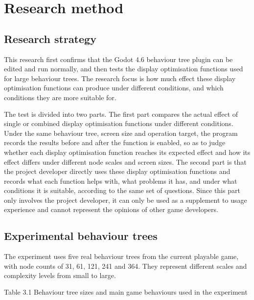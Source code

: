 \documentclass[11pt,a4paper,oneside,extrafontsizes]{memoir}
\begin{document}
\chapter{Research method}

\section{Research strategy}

This research first confirms that the Godot 4.6 behaviour tree plugin can be edited and run normally, and then tests the display optimisation functions used for large behaviour trees. The research focus is how much effect these display optimisation functions can produce under different conditions, and which conditions they are more suitable for.

The test is divided into two parts. The first part compares the actual effect of single or combined display optimisation functions under different conditions. Under the same behaviour tree, screen size and operation target, the program records the results before and after the function is enabled, so as to judge whether each display optimisation function reaches its expected effect and how its effect differs under different node scales and screen sizes. The second part is that the project developer directly uses these display optimisation functions and records what each function helps with, what problems it has, and under what conditions it is suitable, according to the same set of questions. Since this part only involves the project developer, it can only be used as a supplement to usage experience and cannot represent the opinions of other game developers.

\section{Experimental behaviour trees}

The experiment uses five real behaviour trees from the current playable game, with node counts of 31, 61, 121, 241 and 364. They represent different scales and complexity levels from small to large.

Table 3.1 Behaviour tree sizes and main game behaviours used in the experiment
\end{document}
